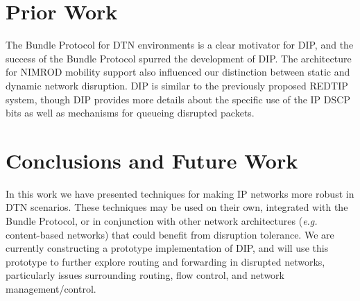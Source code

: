 \documentclass[10pt,letterpaper]{article}
\begin{document}
\section{Prior Work}
The Bundle Protocol\cite{5050:rfc} for DTN environments
\cite{dtn:rfc,dtn_arch_sigcomm} is a clear motivator for DIP, and the
success of the Bundle Protocol spurred the development of DIP.
The architecture for NIMROD mobility support\cite{2103:rfc}
also influenced our distinction between static and dynamic network disruption.
DIP is similar to the previously proposed REDTIP\cite{redtip}
system, though DIP provides more details about the specific use of
the IP DSCP bits as well as mechanisms for queueing disrupted packets.

\section{Conclusions and Future Work}
In this work we have presented techniques for making IP networks
more robust in DTN scenarios. These techniques may be used on their own,
integrated with the Bundle Protocol, or in conjunction with 
other network architectures ({\em e.g.} content-based networks)
that could benefit from disruption tolerance. We are currently
constructing a prototype implementation of DIP, and will
use this prototype to further explore routing and forwarding in
disrupted networks, particularly issues surrounding routing, flow control, and 
network management/control.



\end{document}
